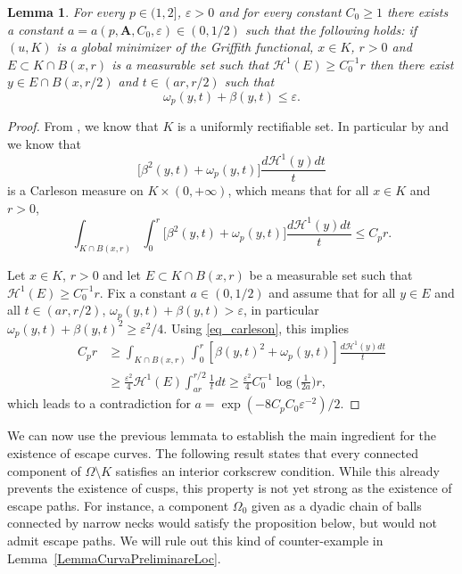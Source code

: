 \documentclass[12pt]{article}
\newtheorem{lemma}[theorem]{Lemma}
\theoremstyle{definition}
\theoremstyle{remark}
\numberwithin{equation}{section}
\newcommand{\A}{\mathbf{A}}
\renewcommand{\H}{\mathcal{H}}
\begin{document}
\begin{lemma}\label{LemmaCarleson}
    For every $p\in(1,2]$, $\varepsilon>0$ and for every constant $C_0 \geq 1$ there exists a constant
    $a=a(p,\A,C_0,\varepsilon) \in (0,1/2)$ such that the following holds: if $(u,K)$ is a global minimizer of the Griffith
    functional, $x\in K$, $r>0$ and $E\subset K\cap B(x,r)$ is a measurable set such that $\H^1(E)\geq
    C_0^{-1}r$ then there exist $y\in E \cap B(x,r/2)$ and $t\in (ar,r/2)$ such that
    \begin{equation}
        \omega_p(y,t)+\beta(y,t) \leq \varepsilon.
    \end{equation}
\end{lemma}
\begin{proof}
    From \cite[Theorem 1.1]{camilleUR}, we know that $K$ is a uniformly rectifiable set. In particular by
    \cite[Corollary 41.5]{d} and \cite[Theorem 23.8]{d} we know that 
    \begin{equation}
        \big[\beta^2(y,t)+\omega_p(y,t)\big]\frac{d\H^1(y)dt}{t}
    \end{equation}
    is a Carleson measure on $K\times(0,+\infty)$, which means that for all $x \in K$ and $r > 0$,
    \begin{equation}\label{eq_carleson}
        \int_{K\cap B(x,r)}\int_0^r\big[\beta^2(y,t)+\omega_p(y,t)\big]\frac{d\H^1(y)dt}{t}\leq C_p r.
    \end{equation}

    Let $x \in K$, $r > 0$ and let $E \subset K \cap B(x,r)$ be a measurable set such that $\H^1(E) \geq C_0^{-1} r$.
    Fix a constant $a \in (0,1/2)$ and assume that for all $y \in E$ and all $t \in (ar,r/2)$,
    $\omega_p(y,t)+\beta(y,t)> \varepsilon$, in particular $\omega_p(y,t) + \beta(y,t)^2 \geq
    \varepsilon^2/4$. Using \eqref{eq_carleson}, this implies
    \begin{align*}
        C_p r &\geq \int_{K\cap B(x,r)}\int_0^r [\beta(y,t)^2+\omega_p(y,t)]\frac{d\H^1(y)dt}{t}\\
              &\geq \frac{\varepsilon^2}{4} \H^1(E) \int_{ar}^{r/2}\frac{1}{t}dt\geq \frac{\varepsilon^2}{ {4}}C_0^{-1}\log\bigg(\frac{1}{2a}\bigg)r,
    \end{align*}
    which leads to a contradiction for $a = \exp(-8C_p C_0 \varepsilon^{-2})/2$.
\end{proof}

We can now use the previous lemmata to establish the main ingredient for the existence of escape curves. The following
result states that every connected component of $\Omega \setminus K$ satisfies an interior corkscrew condition. While
this already prevents the existence of cusps, this property is not yet strong as the existence of escape paths. For instance, a
component $\Omega_0$ given as a dyadic chain of balls connected by narrow necks would satisfy the proposition below,
but would not admit escape paths. We will rule out this kind of counter-example in
Lemma~\ref{LemmaCurvaPreliminareLoc}.
\end{document}
